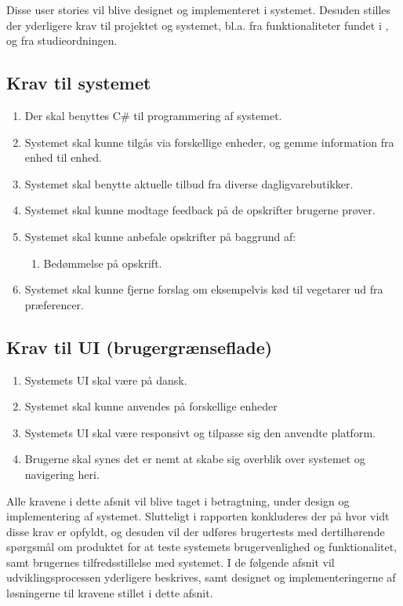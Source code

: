 Disse user stories vil blive designet og implementeret i systemet.
Desuden stilles der yderligere krav til projektet og systemet, bl.a. fra funktionaliteter fundet i , og fra studieordningen.

\subsection{Krav til systemet}
\begin{enumerate}
\item Der skal benyttes C\# til programmering af systemet.
\item Systemet skal kunne tilgås via forskellige enheder, og gemme information fra enhed til enhed.
\item Systemet skal benytte aktuelle tilbud fra diverse dagligvarebutikker.
\item Systemet skal kunne modtage feedback på de opskrifter brugerne prøver.
\item Systemet skal kunne anbefale opskrifter på baggrund af:
\begin{enumerate}
	\item Bedømmelse på opskrift.
\end{enumerate}
\item Systemet skal kunne fjerne forslag om eksempelvis kød til vegetarer ud fra præferencer. 
\end{enumerate}

\subsection{Krav til UI (brugergrænseflade)}
\begin{enumerate}
	\item Systemets UI skal være på dansk.
	\item Systemet skal kunne anvendes på forskellige enheder
	\item Systemets UI skal være responsivt og tilpasse sig den anvendte platform.
	\item Brugerne skal synes det er nemt at skabe sig overblik over systemet og navigering heri.
\end{enumerate}

Alle kravene i dette afsnit vil blive taget i betragtning, under design og implementering af systemet.
Slutteligt i rapporten konkluderes der på hvor vidt disse krav er opfyldt, og desuden vil der udføres brugertests med dertilhørende spørgsmål om produktet for at teste systemets brugervenlighed og funktionalitet, samt brugernes tilfredsstillelse med systemet.
I de følgende afsnit vil udviklingsprocessen yderligere beskrives, samt designet og implementeringerne af løsningerne til kravene stillet i dette afsnit.

